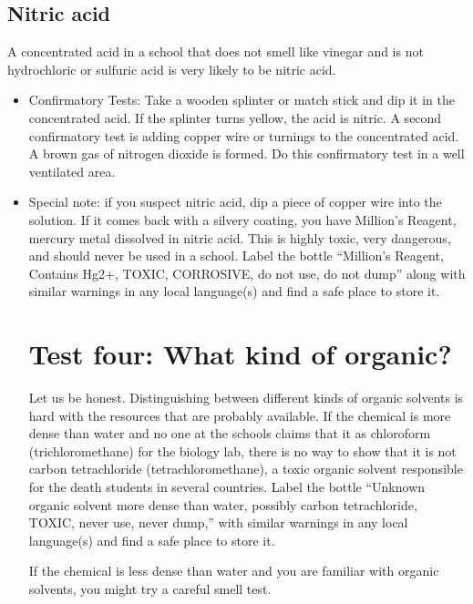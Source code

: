 \subsection{Nitric acid}
A concentrated acid in a school that does not smell like vinegar 
and is not hydrochloric or sulfuric acid is very likely to be nitric acid. 
\begin{itemize}
\item{Confirmatory Tests: Take a wooden splinter 
or match stick and dip it in the concentrated acid. 
If the splinter turns yellow, 
the acid is nitric. 
A second confirmatory test is adding copper wire 
or turnings to the concentrated acid. 
A brown gas of nitrogen dioxide is formed. 
Do this confirmatory test in a well ventilated area.}

\item{Special note: if you suspect nitric acid, 
dip a piece of copper wire into the solution. 
If it comes back with a silvery coating, 
you have Million’s Reagent, 
mercury metal dissolved in nitric acid. 
This is highly toxic, 
very dangerous, 
and should never be used in a school. 
Label the bottle “Million’s Reagent, 
Contains Hg2+, 
TOXIC, 
CORROSIVE, 
do not use, 
do not dump” along with similar warnings 
in any local language(s) and find a safe place to store it.

\section{Test four: What kind of organic?}

Let us be honest. 
Distinguishing between different kinds of organic solvents 
is hard with the resources that are probably available. 
If the chemical is more dense than water 
and no one at the schools claims that it as chloroform 
(trichloromethane) for the biology lab, 
there is no way to show that it is not carbon tetrachloride 
(tetrachloromethane), 
a toxic organic solvent responsible 
for the death students in several countries. 
Label the bottle “Unknown organic solvent more dense than water, 
possibly carbon tetrachloride, 
TOXIC, 
never use, 
never dump,” with similar warnings in any local language(s) 
and find a safe place to store it.

If the chemical is less dense than water 
and you are familiar with organic solvents, 
you might try a careful smell test.

}
\end{itemize}
